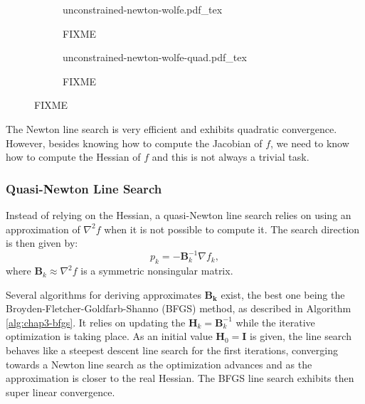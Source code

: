 \begin{figure}
  \centering
  \begin{subfigure}{0.8\columnwidth}
    \centering
        {\def\svgwidth{\linewidth}
          {\footnotesize
            
                       {unconstrained-newton-wolfe.pdf_tex}
          }
        }
        \caption{FIXME}
        \label{fig:chap3-unconstrained-newton-wolfe-a}
  \end{subfigure}
  \begin{subfigure}{0.8\columnwidth}
    \centering
        {\def\svgwidth{\linewidth}
          {\footnotesize
            
                       {unconstrained-newton-wolfe-quad.pdf_tex}
          }
        }
        \caption{FIXME}
        \label{fig:chap3-unconstrained-newton-wolfe-quad}
  \end{subfigure}
  \caption{FIXME}
  \label{fig:chap3-unconstrained-newton-wolfe}
\end{figure}

The Newton line search is very efficient and exhibits quadratic
convergence. However, besides knowing how to compute the Jacobian of
$f$, we need to know how to compute the Hessian of $f$ and this is not
always a trivial task.

\subsubsection{Quasi-Newton Line Search}

Instead of relying on the Hessian, a quasi-Newton line search relies
on using an approximation of $\nabla^2 f$ when it is not possible to
compute it. The search direction is then given by:
\begin{equation}
p_k=-\mathbf{B}_k^{-1}\nabla f_k,
\end{equation}
where $\mathbf{B}_k\approx\nabla^2 f$ is a symmetric nonsingular
matrix.

Several algorithms for deriving approximates $\mathbf{B_k}$ exist, the
best one being the Broyden-Fletcher-Goldfarb-Shanno (BFGS) method, as
described in Algorithm \ref{alg:chap3-bfgs}. It relies on updating the
$\mathbf{H}_k = \mathbf{B}_k^{-1}$ while the iterative optimization is
taking place. As an initial value $\mathbf{H}_0=\mathbf{I}$ is given,
the line search behaves like a steepest descent line search for the
first iterations, converging towards a Newton line search as the
optimization advances and as the approximation is closer to the real
Hessian. The BFGS line search exhibits then super linear convergence.

